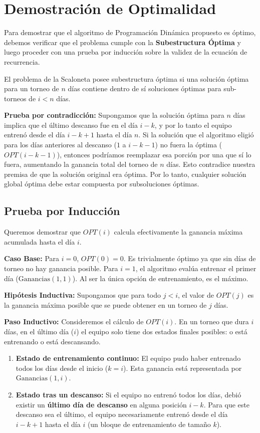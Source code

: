 \section{Demostración de Optimalidad}

Para demostrar que el algoritmo de Programación Dinámica propuesto es óptimo, debemos verificar que el problema cumple con la \textbf{Subestructura Óptima} y luego proceder con una prueba por inducción sobre la validez de la ecuación de recurrencia.

El problema de la Scaloneta posee subestructura óptima si una solución óptima para un torneo de $n$ días contiene dentro de sí soluciones óptimas para sub-torneos de $i < n$ días.

\textbf{Prueba por contradicción:} Supongamos que la solución óptima para $n$ días implica que el último descanso fue en el día $i-k$, y por lo tanto el equipo entrenó desde el día $i-k+1$ hasta el día $n$. Si la solución que el algoritmo eligió para los días anteriores al descanso ($1$ a $i-k-1$) no fuera la óptima ($OPT(i-k-1)$), entonces podríamos reemplazar esa porción por una que sí lo fuera, aumentando la ganancia total del torneo de $n$ días. Esto contradice nuestra premisa de que la solución original era óptima. Por lo tanto, cualquier solución global óptima debe estar compuesta por subsoluciones óptimas.

\subsection{Prueba por Inducción}

Queremos demostrar que $OPT(i)$ calcula efectivamente la ganancia máxima acumulada hasta el día $i$.

\textbf{Caso Base:} Para $i = 0$, $OPT(0) = 0$. Es trivialmente óptimo ya que sin días de torneo no hay ganancia posible. Para $i = 1$, el algoritmo evalúa entrenar el primer día ($\text{Ganancias}(1,1)$). Al ser la única opción de entrenamiento, es el máximo.

\textbf{Hipótesis Inductiva:} Supongamos que para todo $j < i$, el valor de $OPT(j)$ es la ganancia máxima posible que se puede obtener en un torneo de $j$ días.

\textbf{Paso Inductivo:} Consideremos el cálculo de $OPT(i)$. En un torneo que dura $i$ días, en el último día ($i$) el equipo solo tiene dos estados finales posibles: o está entrenando o está descansando.

\begin{enumerate}
    \item \textbf{Estado de entrenamiento continuo:} El equipo pudo haber entrenado todos los días desde el inicio ($k=i$). Esta ganancia está representada por $\text{Ganancias}(1, i)$.
    \item \textbf{Estado tras un descanso:} Si el equipo no entrenó todos los días, debió existir un \textbf{último día de descanso} en alguna posición $i-k$. Para que este descanso sea el último, el equipo necesariamente entrenó desde el día $i-k+1$ hasta el día $i$ (un bloque de entrenamiento de tamaño $k$).
\end{enumerate}

